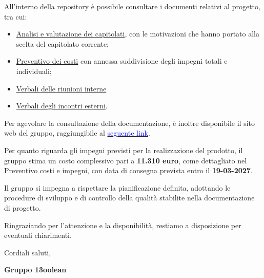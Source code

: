 \documentclass[11pt,a4paper]{article}
\begin{document}
All'interno della repository è possibile consultare i documenti
relativi al progetto, tra cui:

\begin{itemize}[leftmargin=*]
    \item \href{https://13oolean-documentazione.vercel.app/documenti/Candidatura/Valutazione%20dei%20capitolati/valutazione_capitolati.pdf}{Analisi e valutazione dei capitolati}, con le motivazioni
    che hanno portato alla scelta del capitolato corrente;
    \item \href{https://13oolean-documentazione.vercel.app/documenti/Candidatura/Preventivo%20costi%20e%20impegni/preventivo_costi_e_impegni.pdf}{Preventivo dei costi} con annessa suddivisione degli impegni totali e individuali;
    \item \href{https://13oolean-documentazione.vercel.app/documenti/Verbali/Verbali%20interni}{Verbali delle riunioni interne}
	\item \href{https://13oolean-documentazione.vercel.app/documenti/Verbali/Verbali%20esterni}{Verbali degli incontri esterni}.
\end{itemize}

Per agevolare la consultazione della documentazione, è inoltre disponibile il sito web del gruppo, raggiungibile al \href{https://13oolean-documentazione.vercel.app/}{\textcolor{blue}{seguente link}}.


Per quanto riguarda gli impegni previsti per la realizzazione del
prodotto, il gruppo stima un costo complessivo pari a
\textbf{11.310 euro}, come dettagliato nel Preventivo costi e impegni, con data di consegna prevista entro il
\textbf{19-03-2027}.


Il gruppo si impegna a rispettare la pianificazione definita,
adottando le procedure di sviluppo e di controllo della qualità
stabilite nella documentazione di progetto.


Ringraziando per l'attenzione e la disponibilità, restiamo a
disposizione per eventuali chiarimenti.

\medskip

Cordiali saluti,

\medskip

\noindent
\textbf{Gruppo 13oolean}\\
\end{document}

